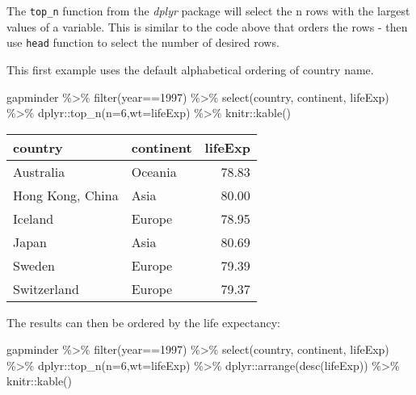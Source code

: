 \documentclass[
]{book}
\newenvironment{Shaded}{\begin{snugshade}}{\end{snugshade}}
\newcommand{\AttributeTok}[1]{\textcolor[rgb]{0.77,0.63,0.00}{#1}}
\newcommand{\DecValTok}[1]{\textcolor[rgb]{0.00,0.00,0.81}{#1}}
\newcommand{\FunctionTok}[1]{\textcolor[rgb]{0.00,0.00,0.00}{#1}}
\newcommand{\NormalTok}[1]{#1}
\newcommand{\SpecialCharTok}[1]{\textcolor[rgb]{0.00,0.00,0.00}{#1}}
\begin{document}
The \texttt{top\_n} function from the \emph{dplyr} package will select the n rows with the largest values of a variable. This is similar to the code above that orders the rows - then use \texttt{head} function to select the number of desired rows.

This first example uses the default alphabetical ordering of country name.

\begin{Shaded}
\begin{Highlighting}[]
\NormalTok{gapminder }\SpecialCharTok{\%\textgreater{}\%} 
  \FunctionTok{filter}\NormalTok{(year}\SpecialCharTok{==}\DecValTok{1997}\NormalTok{) }\SpecialCharTok{\%\textgreater{}\%}  
  \FunctionTok{select}\NormalTok{(country, continent, lifeExp) }\SpecialCharTok{\%\textgreater{}\%}
\NormalTok{  dplyr}\SpecialCharTok{::}\FunctionTok{top\_n}\NormalTok{(}\AttributeTok{n=}\DecValTok{6}\NormalTok{,}\AttributeTok{wt=}\NormalTok{lifeExp) }\SpecialCharTok{\%\textgreater{}\%}
\NormalTok{  knitr}\SpecialCharTok{::}\FunctionTok{kable}\NormalTok{()}
\end{Highlighting}
\end{Shaded}

\begin{tabular}{l|l|r}
\hline
country & continent & lifeExp\\
\hline
Australia & Oceania & 78.83\\
\hline
Hong Kong, China & Asia & 80.00\\
\hline
Iceland & Europe & 78.95\\
\hline
Japan & Asia & 80.69\\
\hline
Sweden & Europe & 79.39\\
\hline
Switzerland & Europe & 79.37\\
\hline
\end{tabular}

The results can then be ordered by the life expectancy:

\begin{Shaded}
\begin{Highlighting}[]
\NormalTok{gapminder }\SpecialCharTok{\%\textgreater{}\%} 
  \FunctionTok{filter}\NormalTok{(year}\SpecialCharTok{==}\DecValTok{1997}\NormalTok{) }\SpecialCharTok{\%\textgreater{}\%}  
  \FunctionTok{select}\NormalTok{(country, continent, lifeExp) }\SpecialCharTok{\%\textgreater{}\%}
\NormalTok{  dplyr}\SpecialCharTok{::}\FunctionTok{top\_n}\NormalTok{(}\AttributeTok{n=}\DecValTok{6}\NormalTok{,}\AttributeTok{wt=}\NormalTok{lifeExp) }\SpecialCharTok{\%\textgreater{}\%}
\NormalTok{  dplyr}\SpecialCharTok{::}\FunctionTok{arrange}\NormalTok{(}\FunctionTok{desc}\NormalTok{(lifeExp)) }\SpecialCharTok{\%\textgreater{}\%}
\NormalTok{  knitr}\SpecialCharTok{::}\FunctionTok{kable}\NormalTok{()}
\end{Highlighting}
\end{Shaded}
\end{document}
